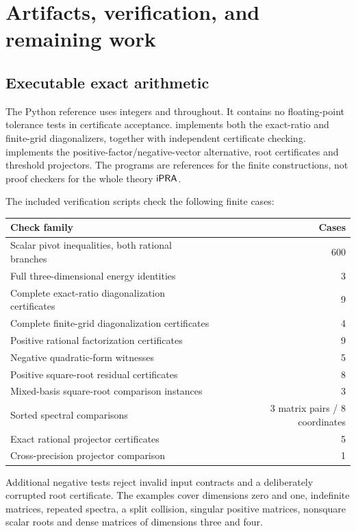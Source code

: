 \section{Artifacts, verification, and remaining work}
\label{sec:validation}

\subsection{Executable exact arithmetic}

The Python reference uses integers and  throughout. It contains no floating-point tolerance tests in certificate acceptance.  implements both the exact-ratio and finite-grid diagonalizers, together with independent certificate checking.  implements the positive-factor/negative-vector alternative, root certificates and threshold projectors. The programs are references for the finite constructions, not proof checkers for the whole theory $\mathsf{iPRA}$.

The included verification scripts check the following finite cases:
\begin{center}
\begin{tabular}{lr}
\toprule
Check family & Cases \\
\midrule
Scalar pivot inequalities, both rational branches & 600 \\
Full three-dimensional energy identities & 3 \\
Complete exact-ratio diagonalization certificates & 9 \\
Complete finite-grid diagonalization certificates & 4 \\
Positive rational factorization certificates & 9 \\
Negative quadratic-form witnesses & 5 \\
Positive square-root residual certificates & 8 \\
Mixed-basis square-root comparison instances & 3 \\
Sorted spectral comparisons & 3 matrix pairs / 8 coordinates \\
Exact rational projector certificates & 5 \\
Cross-precision projector comparison & 1 \\
\bottomrule
\end{tabular}
\end{center}
Additional negative tests reject invalid input contracts and a deliberately corrupted root certificate. The examples cover dimensions zero and one, indefinite matrices, repeated spectra, a split collision, singular positive matrices, nonsquare scalar roots and dense matrices of dimensions three and four.

